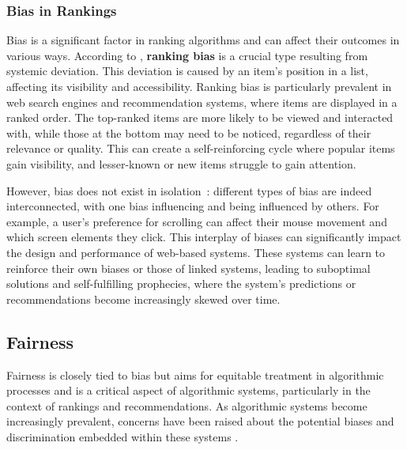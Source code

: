 \subsubsection{Bias in Rankings}
\label{subsec:bias_rank}

Bias is a significant factor in ranking algorithms and can affect their outcomes in various ways. According to \cite{mehrabi2021survey}, \textbf{ranking bias} is a crucial type resulting from systemic deviation. This deviation is caused by an item's position in a list, affecting its visibility and accessibility. Ranking bias is particularly prevalent in web search engines and recommendation systems, where items are displayed in a ranked order. The top-ranked items are more likely to be viewed and interacted with, while those at the bottom may need to be noticed, regardless of their relevance or quality. This can create a self-reinforcing cycle where popular items gain visibility, and lesser-known or new items struggle to gain attention.

However, bias does not exist in isolation~\cite{baeza2018bias}:
different types of bias are indeed interconnected, with one bias influencing and being influenced by others. For example, a user's preference for scrolling can affect their mouse movement and which screen elements they click. This interplay of biases can significantly impact the design and performance of web-based systems. These systems can learn to reinforce their own biases or those of linked systems, leading to suboptimal solutions and self-fulfilling prophecies, where the system's predictions or recommendations become increasingly skewed over time.


\subsection{Fairness}
\label{sec:fairness}


Fairness is closely tied to bias but aims for equitable treatment in algorithmic processes and is a critical aspect of algorithmic systems, particularly in the context of rankings and recommendations. As algorithmic systems become increasingly prevalent, concerns have been raised about the potential biases and discrimination embedded within these systems \cite{zehlike2022fairness1,zehlike2022fairness2}.

